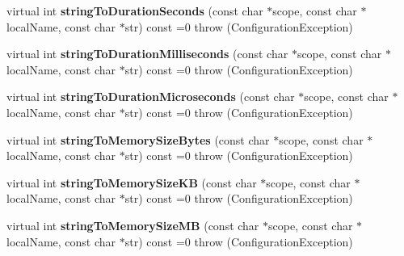 \begin{DoxyCompactItemize}
\item 
\hypertarget{classCONFIG4CPP__NAMESPACE_1_1Configuration_a80a4e0f72cd68ddbf49b641385f0f583}{virtual int {\bfseries string\-To\-Duration\-Seconds} (const char $\ast$scope, const char $\ast$local\-Name, const char $\ast$str) const =0  throw (\-Configuration\-Exception)}\label{classCONFIG4CPP__NAMESPACE_1_1Configuration_a80a4e0f72cd68ddbf49b641385f0f583}

\item 
\hypertarget{classCONFIG4CPP__NAMESPACE_1_1Configuration_ad0f5ff24d51e84e0dea736b8cf08876f}{virtual int {\bfseries string\-To\-Duration\-Milliseconds} (const char $\ast$scope, const char $\ast$local\-Name, const char $\ast$str) const =0  throw (\-Configuration\-Exception)}\label{classCONFIG4CPP__NAMESPACE_1_1Configuration_ad0f5ff24d51e84e0dea736b8cf08876f}

\item 
\hypertarget{classCONFIG4CPP__NAMESPACE_1_1Configuration_a540eed3e343c481b1333e29d2c1f418e}{virtual int {\bfseries string\-To\-Duration\-Microseconds} (const char $\ast$scope, const char $\ast$local\-Name, const char $\ast$str) const =0  throw (\-Configuration\-Exception)}\label{classCONFIG4CPP__NAMESPACE_1_1Configuration_a540eed3e343c481b1333e29d2c1f418e}

\item 
\hypertarget{classCONFIG4CPP__NAMESPACE_1_1Configuration_a35490a4272c0724867821660792cc19f}{virtual int {\bfseries string\-To\-Memory\-Size\-Bytes} (const char $\ast$scope, const char $\ast$local\-Name, const char $\ast$str) const =0  throw (\-Configuration\-Exception)}\label{classCONFIG4CPP__NAMESPACE_1_1Configuration_a35490a4272c0724867821660792cc19f}

\item 
\hypertarget{classCONFIG4CPP__NAMESPACE_1_1Configuration_a4240e07235083dcac0628e7aa02c491c}{virtual int {\bfseries string\-To\-Memory\-Size\-K\-B} (const char $\ast$scope, const char $\ast$local\-Name, const char $\ast$str) const =0  throw (\-Configuration\-Exception)}\label{classCONFIG4CPP__NAMESPACE_1_1Configuration_a4240e07235083dcac0628e7aa02c491c}

\item 
\hypertarget{classCONFIG4CPP__NAMESPACE_1_1Configuration_a2c4feaf8af621754b16caedbd656861b}{virtual int {\bfseries string\-To\-Memory\-Size\-M\-B} (const char $\ast$scope, const char $\ast$local\-Name, const char $\ast$str) const =0  throw (\-Configuration\-Exception)}\label{classCONFIG4CPP__NAMESPACE_1_1Configuration_a2c4feaf8af621754b16caedbd656861b}


\end{DoxyCompactItemize}

